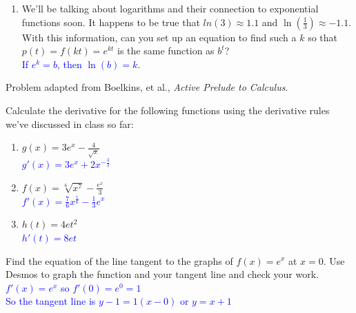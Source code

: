 \documentclass{ximera}
\begin{document}
\begin{exercise}
\begin{enumerate}
        \item  We'll be talking about logarithms and their connection to exponential functions soon. 
        It happens to be true that $ln(3)\approx 1.1$ and $\ln(\frac{1}{3})\approx -1.1$. With this information, can you set up an equation to find such a $k$ so that $p(t)=f(kt)=e^{kt}$ is the same function as $b^t$? \\
        \textcolor{blue}{ If $e^k=b$, then $\ln(b)=k$.}
   
   
    \end{enumerate}  
   
    Problem adapted from Boelkins, et al., \textit{Active Prelude to Calculus}.
\end{exercise}

\begin{exercise}
    Calculate the derivative for the following functions using the derivative rules we've discussed in class so far: 
        \begin{enumerate}
                \item $g(x)=3e^x-\frac{4}{\sqrt{x}}$\\
                \textcolor{blue}{ $g'(x)=3e^x+2 x^{-\frac32}$}
    
                \item $f(x)=\sqrt[6]{x^7} -\frac{e^x}{3}$\\
                \textcolor{blue}{ $f'(x)=\frac{7}{6}x^{\frac16}-\frac13e^x$}
    
                \item $h(t)=4et^2$\\
                \textcolor{blue}{ $h'(t)=8et$}
    
        \end{enumerate}
\end{exercise}

\begin{exercise}
    Find the equation of the line tangent to the graphs of $f(x)=e^x$ at $x=0$.  Use Desmos to graph the function and your tangent line and check your work.\\
    \textcolor{blue}{ $f'(x)=e^x$ so $f'(0)=e^0=1$\\
    So the tangent line is $y-1=1(x-0)$ or $y=x+1$}
    \begin{center}
    \end{center}
    
\end{exercise}
\end{document}
